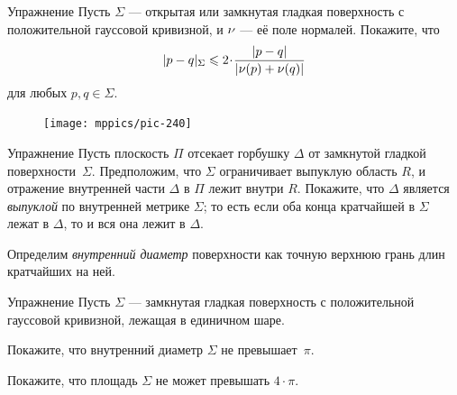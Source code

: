 \begin{thm}{Упражнение}\label{ex:length-dist-conv}
Пусть $\Sigma$ --- открытая или замкнутая гладкая поверхность с положительной гауссовой кривизной, и $\nu$ --- её поле нормалей.
Покажите, что 
\[\dist{p}{q}\Sigma\le 2\cdot \frac{|p-q|}{|\Norm(p)+\Norm(q)|}\]
для любых $p,q\in \Sigma$.
\end{thm}


\begin{figure}
\vskip-14mm
\centering
\texttt{[image: mppics/pic-240]}
\end{figure}

\begin{thm}{Упражнение}\label{ex:hat-convex}
Пусть плоскость $\Pi$ отсекает горбушку $\Delta$ от замкнутой гладкой поверхности~$\Sigma$.
Предположим, что $\Sigma$ ограничивает выпуклую область $R$, и отражение внутренней части $\Delta$ в $\Pi$ лежит внутри $R$.
Покажите, что $\Delta$ является \emph{выпуклой} по внутренней метрике $\Sigma$;
то есть 
если оба конца кратчайшей в $\Sigma$ 
лежат в $\Delta$,
то и вся она лежит в $\Delta$.
\end{thm}

Определим \emph{внутренний диаметр} поверхности как точную верхнюю грань длин кратчайших на ней.

\begin{thm}{Упражнение}\label{ex:intrinsic-diameter}
Пусть $\Sigma$ --- замкнутая гладкая поверхность с положительной гауссовой кривизной, лежащая в единичном шаре.

\begin{subthm}{} Покажите, что внутренний диаметр $\Sigma$ не превышает~$\pi$.
\end{subthm}

\begin{subthm}{}
Покажите, что площадь $\Sigma$ не может превышать $4\cdot \pi$.
\end{subthm}

\end{thm}

